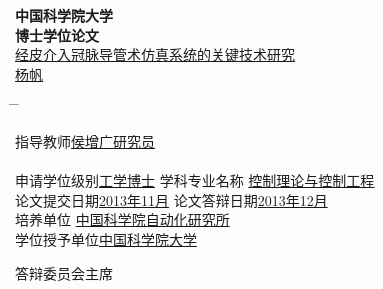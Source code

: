 \vspace*{1.7cm} %
\begin{center}
{\Huge \song \textbf{中国科学院大学}}\\
\vspace{0.8cm} {\Huge \song \textbf{博士学位论文}}\\
\vspace{1.8cm}
{\xiaoerhao \song \underline{经皮介入冠脉导管术仿真系统的关键技术研究}}\\
\vspace{1.1cm} {\sanhao \underline{\;杨\;\;\;\;帆\;}}\\
\end{center}
\sanhao \vspace{1.2cm}
\begin{tabbing}
\hspace*{-0.8cm} \= \hspace{6.4cm} \= \kill

\>指导教师\underline{\hspace{4.8cm}侯增广\;\;研究员\hspace{4.6cm}}\\

\>\hspace{2.0cm} \underline{\hspace{13.1cm}}\\

\>申请学位级别\underline{\hspace{0.5cm}工学博士\hspace{0.5cm}} \>学科专业名称 \underline{\hspace{0.2cm}控制理论与控制工程\hspace{0.2cm}}\\

\>论文提交日期\underline{\hspace{0.3cm}2013年11月\hspace{0.3cm}} \> 论文答辩日期\underline{\hspace{1.4cm}2013年12月\hspace{1.4cm}}\\

\>培养单位 \underline{\hspace{3.5cm}中国科学院自动化研究所 \hspace{3.5cm}} \\

\>学位授予单位\underline{\hspace{3.5cm}中国科学院大学 \hspace{4.6cm}} \\
\end{tabbing}
\vspace{0.5cm}
\hspace*{7.1cm}答辩委员会主席\underline{\hspace{3.4cm}}
